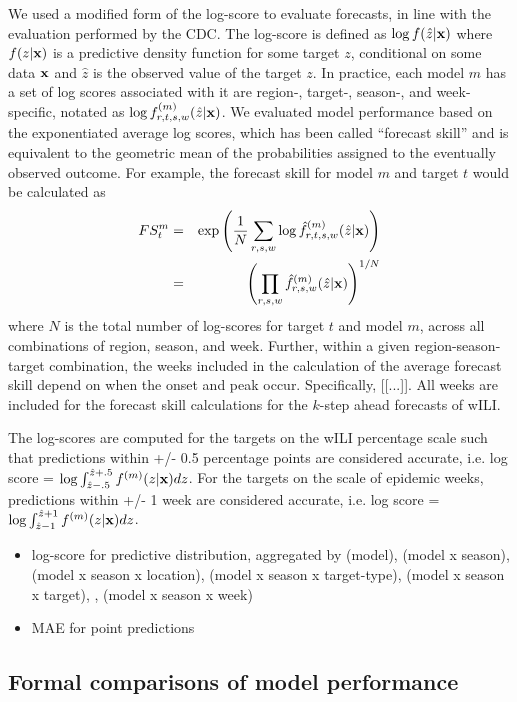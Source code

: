 \documentclass{article}\usepackage[]{graphicx}\usepackage[]{color}
\begin{document}
We used a modified form of the log-score to evaluate forecasts, in line with the evaluation performed by the CDC. The log-score is defined as $\log f(\hat z|\bf{x})$ where $f(z|\bf{x})$ is a predictive density function for some target $z$, conditional on some data $\bf{x}$ and $\hat z$ is the observed value of the target $z$. In practice, each model $m$ has a set of log scores associated with it are region-, target-, season-, and week- specific, notated as $\log f^{(m)}_{r,t,s,w}(\hat z|\bf{x})$. We evaluated model performance based on the exponentiated average log scores, which has been called ``forecast skill'' and is equivalent to the geometric mean of the probabilities assigned to the eventually observed outcome. 
For example, the forecast skill for model $m$ and target $t$ would be calculated as
\begin{eqnarray}
 FS^{m}_{t} & = & \exp \left ( \frac{1}{N} \sum_{r,s,w} \log \hat f^{(m)}_{r,t,s,w}(\hat z|{\bf x}) \right ) \\
 & = & \left ( \prod_{r,s,w} \hat f^{(m)}_{r,s,w}(\hat z|{\bf x}) \right ) ^{1/N} 
\end{eqnarray}
where $N$ is the total number of log-scores for target $t$ and model $m$, across all combinations of region, season, and week. 
Further, within a given region-season-target combination, the weeks included in the calculation of the average forecast skill depend on when the onset and peak occur. Specifically, [[...]].
All weeks are included for the forecast skill calculations for the $k$-step ahead forecasts of wILI.

The log-scores are computed for the targets on the wILI percentage scale such that predictions within +/- 0.5 percentage points are considered accurate, i.e. log score = $\log \int_{\hat z -.5}^{\hat z + .5} f^{(m)}(z|{\bf{x}})dz$. For the targets on the scale of epidemic weeks, predictions within +/- 1 week are considered accurate, i.e. log score = $\log \int_{\hat z -1}^{\hat z + 1} f^{(m)}(z|{\bf{x}})dz$. 
\begin{itemize}
    \item log-score for predictive distribution, aggregated by (model), (model x season), (model x season x location), (model x season x target-type), (model x season x target), , (model x season x week)
    \item MAE for point predictions
\end{itemize}

\subsection{Formal comparisons of model performance}
\end{document}
